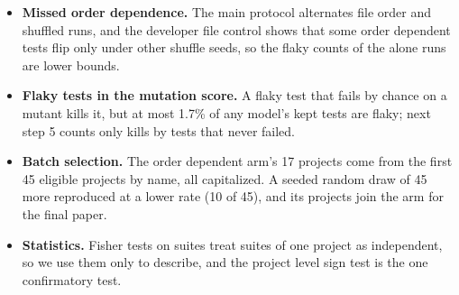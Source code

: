 \begin{itemize}
\item \textbf{Missed order dependence.} The main protocol alternates file order and shuffled runs, and the developer file control shows that some order dependent tests flip only under other shuffle seeds, so the flaky counts of the alone runs are lower bounds.
\item \textbf{Flaky tests in the mutation score.} A flaky test that fails by chance on a mutant kills it, but at most 1.7\% of any model's kept tests are flaky; next step 5 counts only kills by tests that never failed.
\item \textbf{Batch selection.} The order dependent arm's 17 projects come from the first 45 eligible projects by name, all capitalized. A seeded random draw of 45 more reproduced at a lower rate (10 of 45), and its projects join the arm for the final paper.
\item \textbf{Statistics.} Fisher tests on suites treat suites of one project as independent, so we use them only to describe, and the project level sign test is the one confirmatory test.
\end{itemize}

